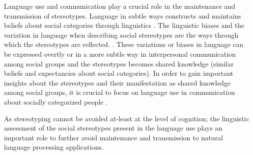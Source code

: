  Language use and communication play a crucial role in the maintenance and transmission of stereotypes. Language in subtle ways constructs and maintains beliefs about social categories through linguistics \cite{beukeboom2019stereotypes}.  The linguistic biases and the variation in language when describing social stereotypes are the ways through which the stereotypes are reflected. \cite{burgers2020language}. These variations or biases in language can be expressed overtly or in a more subtle way in interpersonal communication among social groups and the stereotypes becomes shared knowledge (similar beliefs and expectancies about social categories). In order to gain important insights about the stereotypes and their manifestation as shared knowledge among social groups, it is crucial to focus on language use in communication about socially categorized people \cite{beukeboom2019stereotypes}.
 
 
 
 
 
 

As stereotyping cannot be avoided at-least at the level of cognition; the linguistic assessment of the social stereotypes present in the language use plays an important role to further avoid maintenance and transmission to natural language processing applications. 

